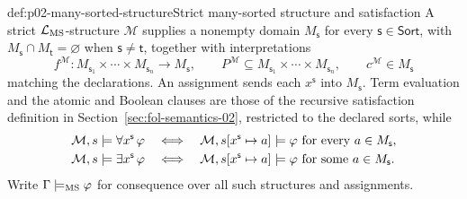 \begin{hbdefinition}{def:p02-many-sorted-structure}{Strict many-sorted structure and satisfaction}
A strict \(\mathcal{L}_{\mathrm{MS}}\)-structure \(\mathcal M\) supplies a nonempty
domain \(M_{\mathsf s}\) for every \(\mathsf s\in\mathsf{Sort}\), with
\(M_{\mathsf s}\cap M_{\mathsf t}=\varnothing\) when
\(\mathsf s\ne\mathsf t\), together with interpretations
\[
 f^{\mathcal M}:M_{\mathsf s_1}\times\cdots\times M_{\mathsf s_n}
   \longrightarrow M_{\mathsf s},
 \qquad
 P^{\mathcal M}\subseteq M_{\mathsf s_1}\times\cdots\times M_{\mathsf s_n},
 \qquad
 c^{\mathcal M}\in M_{\mathsf s}
\]
matching the declarations.  An assignment sends each \(x^{\mathsf s}\) into
\(M_{\mathsf s}\).
Term evaluation and the atomic and Boolean clauses are those of
the recursive satisfaction definition in Section~\ref{sec:fol-semantics-02},
restricted to the declared sorts,
while
\[
\begin{aligned}
 \mathcal M,s\models\forall x^{\mathsf s}\,\varphi
 &\quad\Longleftrightarrow\quad
 \mathcal M,s[x^{\mathsf s}\mapsto a]\models\varphi
 \text{ for every }a\in M_{\mathsf s},\\
 \mathcal M,s\models\exists x^{\mathsf s}\,\varphi
 &\quad\Longleftrightarrow\quad
 \mathcal M,s[x^{\mathsf s}\mapsto a]\models\varphi
 \text{ for some }a\in M_{\mathsf s}.
\end{aligned}
\]
Write \(\Gamma\models_{\mathrm{MS}}\varphi\) for consequence over all such
structures and assignments.
\end{hbdefinition}

